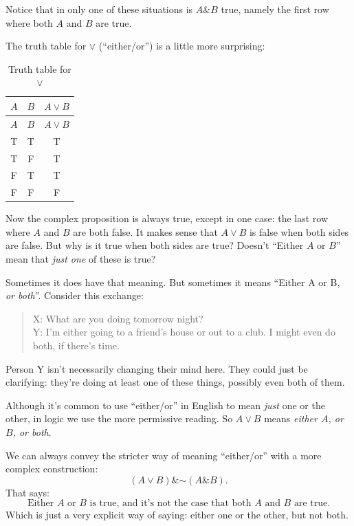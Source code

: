 \documentclass[justified]{tufte-book}
\renewcommand{\neg}{\mathbin{\sim}}
\renewcommand{\wedge}{\mathbin{\&}}
\theoremstyle{definition}
\theoremstyle{definition}
\theoremstyle{definition}
\theoremstyle{remark}
\begin{document}
Notice that in only one of these situations is \(A \& B\) true, namely the first row where both \(A\) and \(B\) are true.

The truth table for \(\vee\) (``either/or'') is a little more surprising:
\begin{longtable}[]{@{}ccc@{}}
\caption{\label{tab:unnamed-chunk-31}Truth table for \(\vee\)}\tabularnewline
\toprule
\(A\) & \(B\) & \(A \vee B\)\tabularnewline
\midrule
\endfirsthead
\toprule
\(A\) & \(B\) & \(A \vee B\)\tabularnewline
\midrule
\endhead
T & T & T\tabularnewline
T & F & T\tabularnewline
F & T & T\tabularnewline
F & F & F\tabularnewline
\bottomrule
\end{longtable}
\noindent Now the complex proposition is always true, except in one case: the last row where \(A\) and \(B\) are both false. It makes sense that \(A \vee B\) is false when both sides are false. But why is it true when both sides are true? Doesn't ``Either \(A\) or \(B\)'' mean that \emph{just one} of these is true?

Sometimes it does have that meaning. But sometimes it means ``Either A or B, \emph{or both}''. Consider this exchange:

\begin{quote}
X: What are you doing tomorrow night?\\
Y: I'm either going to a friend's house or out to a club. I might even do both, if there's time.
\end{quote}

Person Y isn't necessarily changing their mind here. They could just be clarifying: they're doing at least one of these things, possibly even both of them.

Although it's common to use ``either/or'' in English to mean \emph{just} one or the other, in logic we use the more permissive reading. So \(A \vee B\) means \emph{either \(A\), or \(B\), or both}.

We can always convey the stricter way of meaning ``either/or'' with a more complex construction:
\[(A \vee B) \wedge \neg (A \wedge B).\]
That says:
\[ \mbox{Either $A$ or $B$ is true, and it's not the case that both $A$ and $B$ are true}.\]
Which is just a very explicit way of saying: either one or the other, but not both.
\end{document}
